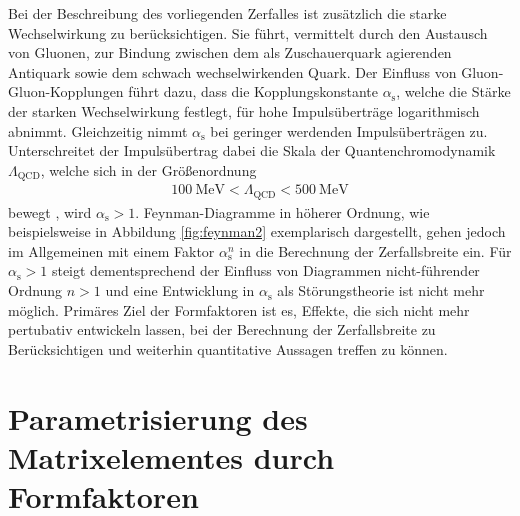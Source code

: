 Bei der Beschreibung des vorliegenden Zerfalles ist zusätzlich die starke Wechselwirkung zu berücksichtigen.
Sie führt, vermittelt durch den Austausch von Gluonen, zur Bindung zwischen dem als Zuschauerquark agierenden Antiquark sowie dem schwach wechselwirkenden Quark. 
Der Einfluss von Gluon-Gluon-Kopplungen führt dazu, dass die Kopplungskonstante $\alpha_\text{s}$, welche die Stärke der starken Wechselwirkung festlegt, für hohe Impulsüberträge logarithmisch abnimmt.
Gleichzeitig nimmt $\alpha_\text{s}$ bei geringer werdenden Impulsüberträgen zu.
Unterschreitet der Impulsübertrag dabei die Skala der Quantenchromodynamik $\Lambda_\text{QCD}$, welche sich in der Größenordnung
\begin{align*}
  \SI{100}{\mega\electronvolt} < \Lambda_\text{QCD} < \SI{500}{\mega\electronvolt}
\end{align*}
bewegt \cite{griffiths2008introduction}, wird $\alpha_\text{s} > 1$.
Feynman-Diagramme in höherer Ordnung, wie beispielsweise in Abbildung \ref{fig:feynman2} exemplarisch dargestellt, gehen jedoch im Allgemeinen mit einem Faktor $\alpha_\text{s}^n$ in die Berechnung der Zerfallsbreite ein.
Für $\alpha_\text{s} > 1$ steigt dementsprechend der Einfluss von Diagrammen nicht-führender Ordnung $n>1$ und eine Entwicklung in $\alpha_\text{s}$ als Störungstheorie ist nicht mehr möglich.
Primäres Ziel der Formfaktoren ist es, Effekte, die sich nicht mehr pertubativ entwickeln lassen, bei der Berechnung der Zerfallsbreite zu Berücksichtigen und weiterhin quantitative Aussagen treffen zu können.

\section{Parametrisierung des Matrixelementes durch Formfaktoren}

